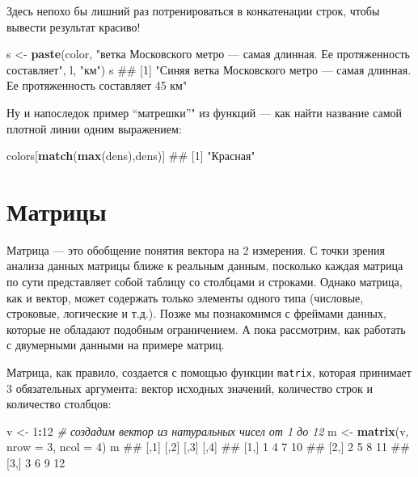 \documentclass[]{book}
\newenvironment{Shaded}{\begin{snugshade}}{\end{snugshade}}
\newcommand{\KeywordTok}[1]{\textcolor[rgb]{0.13,0.29,0.53}{\textbf{#1}}}
\newcommand{\DataTypeTok}[1]{\textcolor[rgb]{0.13,0.29,0.53}{#1}}
\newcommand{\DecValTok}[1]{\textcolor[rgb]{0.00,0.00,0.81}{#1}}
\newcommand{\StringTok}[1]{\textcolor[rgb]{0.31,0.60,0.02}{#1}}
\newcommand{\CommentTok}[1]{\textcolor[rgb]{0.56,0.35,0.01}{\textit{#1}}}
\newcommand{\OperatorTok}[1]{\textcolor[rgb]{0.81,0.36,0.00}{\textbf{#1}}}
\newcommand{\NormalTok}[1]{#1}
\begin{document}
Здесь непохо бы лишний раз потренироваться в конкатенации строк, чтобы
вывести результат красиво!

\begin{Shaded}
\begin{Highlighting}[]
\NormalTok{s <-}\StringTok{ }\KeywordTok{paste}\NormalTok{(color, }\StringTok{"ветка Московского метро — самая длинная. Ее протяженность составляет"}\NormalTok{, l, }\StringTok{"км"}\NormalTok{)}
\NormalTok{s}
\NormalTok{## [1] "Синяя ветка Московского метро — самая длинная. Ее протяженность составляет 45 км"}
\end{Highlighting}
\end{Shaded}

Ну и напоследок пример ``матрешки''" из функций --- как найти название
самой плотной линии одним выражением:

\begin{Shaded}
\begin{Highlighting}[]
\NormalTok{colors[}\KeywordTok{match}\NormalTok{(}\KeywordTok{max}\NormalTok{(dens),dens)]}
\NormalTok{## [1] "Красная"}
\end{Highlighting}
\end{Shaded}

\section{Матрицы}\label{matrices}

Матрица --- это обобщение понятия вектора на 2 измерения. С точки зрения
анализа данных матрицы ближе к реальным данным, посколько каждая матрица
по сути представляет собой таблицу со столбцами и строками. Однако
матрица, как и вектор, может содержать только элементы одного типа
(числовые, строковые, логические и т.д.). Позже мы познакомимся с
фреймами данных, которые не обладают подобным ограничением. А пока
рассмотрим, как работать с двумерными данными на примере матриц.

Матрица, как правило, создается с помощью функции \texttt{matrix},
которая принимает 3 обязательных аргумента: вектор исходных значений,
количество строк и количество столбцов:

\begin{Shaded}
\begin{Highlighting}[]
\NormalTok{v <-}\StringTok{ }\DecValTok{1}\OperatorTok{:}\DecValTok{12}  \CommentTok{# создадим вектор из натуральных чисел от 1 до 12}
\NormalTok{m <-}\StringTok{ }\KeywordTok{matrix}\NormalTok{(v, }\DataTypeTok{nrow =} \DecValTok{3}\NormalTok{, }\DataTypeTok{ncol =} \DecValTok{4}\NormalTok{)}
\NormalTok{m}
\NormalTok{##      [,1] [,2] [,3] [,4]}
\NormalTok{## [1,]    1    4    7   10}
\NormalTok{## [2,]    2    5    8   11}
\NormalTok{## [3,]    3    6    9   12}
\end{Highlighting}
\end{Shaded}
\end{document}
